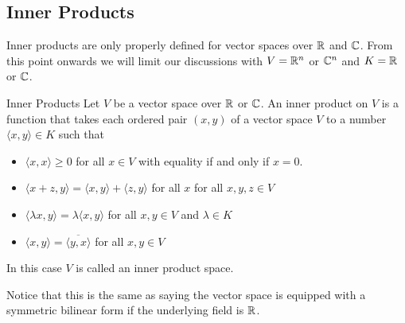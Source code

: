 \documentclass[a4paper]{article}
\begin{document}
\subsection{Inner Products}
Inner products are only properly defined for vector spaces over $\mathbb{R}$ and $\mathbb{C}$. From this point onwards we will limit our discussions with $V=\mathbb{R}^n$ or $\mathbb{C}^n$ and $K=\mathbb{R}$ or $\mathbb{C}$. 

\begin{defn}{Inner Products}{} Let $V$ be a vector space over $\mathbb{R}$ or $\mathbb{C}$. An inner product on $V$ is a function that takes each ordered pair $(x,y)$ of a vector space $V$ to a number $\langle x,y\rangle\in K$ such that 
\begin{itemize}
\item $\langle x,x\rangle\geq0$ for all $x\in V$ with equality if and only if $x=0$. 
\item $\langle x+z,y\rangle=\langle x,y\rangle+\langle z,y\rangle$ for all $x$ for all $x,y,z\in V$
\item $\langle \lambda x,y\rangle=\lambda\langle x,y\rangle$ for all $x,y\in V$ and $\lambda\in K$
\item $\langle x,y\rangle=\overline{\langle y,x\rangle}$ for all $x,y\in V$
\end{itemize}
In this case $V$ is called an inner product space. 
\end{defn}

Notice that this is the same as saying the vector space is equipped with a symmetric bilinear form if the underlying field is $\mathbb{R}$. 
\end{document}
